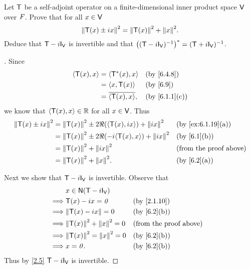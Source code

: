 \begin{ex}\label{ex:6.4.10}
  Let \(\mathsf{T}\) be a self-adjoint operator on a finite-dimensional inner product space \(\mathsf{V}\) over \(\mathit{F}\).
  Prove that for all \(x \in \mathsf{V}\)
  \[
    \norm{\T(x) \pm ix}^2 = \norm{\T(x)}^2 + \norm{x}^2.
  \]
  Deduce that \(\T - i \IT[\V]\) is invertible and that \(\pa{(\T - i \IT[\V])^{-1}}^* = (\T + i \IT[\V])^{-1}\).
\end{ex}

\begin{proof}[]
  Since
  \begin{align*}
    \inn{\T(x), x} & = \inn{\T^*(x), x}       &  & \by{6.4.8}    \\
                   & = \inn{x, \T(x)}         &  & \by{6.9}      \\
                   & = \conj{\inn{\T(x), x}}, &  & \by{6.1.1}[c]
  \end{align*}
  we know that \(\left\langle\mathsf{T}(x), x\right\rangle \in \mathbb{R}\) for all \(x \in \mathsf{V}\).
  Thus
  \begin{align*}
    \norm{\T(x) \pm ix}^2 & = \norm{\T(x)}^2 \pm 2 \Re(\inn{\T(x), ix}) + \norm{ix}^2   &  & \by{ex:6.1.19}[a]             \\
                          & = \norm{\T(x)}^2 \pm 2 \Re(-i \inn{\T(x), x}) + \norm{ix}^2 &  & \by{6.1}[b]                   \\
                          & = \norm{\T(x)}^2 + \norm{ix}^2                              &  & \text{(from the proof above)} \\
                          & = \norm{\T(x)}^2 + \norm{x}^2.                              &  & \by{6.2}[a]
  \end{align*}

  Next we show that \(\T - i \IT[\V]\) is invertible.
  Observe that
  \begin{align*}
             & x \in \ns{\T - i \IT[\V]}                                          \\
    \implies & \T(x) - ix = \zv                &  & \by{2.1.10}                   \\
    \implies & \norm{\T(x) - ix} = 0           &  & \by{6.2}[b]                   \\
    \implies & \norm{\T(x)}^2 + \norm{x}^2 = 0 &  & \text{(from the proof above)} \\
    \implies & \norm{\T(x)}^2 = \norm{x}^2 = 0 &  & \by{6.2}[b]                   \\
    \implies & x = \zv.                        &  & \by{6.2}[b]
  \end{align*}
  Thus by \cref{2.5} \(\T - i \IT[\V]\) is invertible.


\end{proof}

